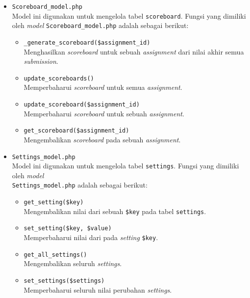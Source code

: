 \documentclass[a4paper,twoside]{article}
\begin{document}
\begin{enumerate}
\begin{itemize}
\begin{itemize}
			                  \vspace{0.5cm}
			            \item \verb|Scoreboard_model.php| \\
			                  Model ini digunakan untuk mengelola tabel \verb|scoreboard|. Fungsi yang dimiliki oleh \textit{model} \verb|Scoreboard_model.php| adalah sebagai berikut:

			                  \begin{itemize}
				                  \item \verb|_generate_scoreboard($assignment_id)| \\
				                        Menghasilkan \textit{scoreboard} untuk sebuah \textit{assignment} dari nilai akhir semua \textit{submission}.
				                  \item \verb|update_scoreboards()| \\
				                        Memperbaharui \textit{scoreboard} untuk semua \textit{assignment}.
				                  \item \verb|update_scoreboard($assignment_id)| \\
				                        Memperbaharui \textit{scoreboard} untuk sebuah \textit{assignment}.
				                  \item \verb|get_scoreboard($assignment_id)| \\
				                        Mengembalikan \textit{scoreboard} pada sebuah \textit{assignment}.
			                  \end{itemize}

			                  \vspace{0.5cm}
			            \item \verb|Settings_model.php| \\
			                  Model ini digunakan untuk mengelola tabel \verb|settings|. Fungsi yang dimiliki oleh \textit{model} \\\verb|Settings_model.php| adalah sebagai berikut:

			                  \begin{itemize}
				                  \item \verb|get_setting($key)| \\
				                        Mengembalikan nilai dari sebuah \verb|$key| pada tabel \verb|settings|.
				                  \item \verb|set_setting($key, $value)| \\
				                        Memperbaharui nilai dari pada \textit{setting} \verb|$key|.
				                  \item \verb|get_all_settings()| \\
				                        Mengembalikan seluruh \textit{settings}.
				                  \item \verb|set_settings($settings)| \\
				                        Memperbaharui seluruh nilai perubahan \textit{settings}.
			                  \end{itemize}


\end{itemize}
\end{itemize}
\end{enumerate}
\end{document}
